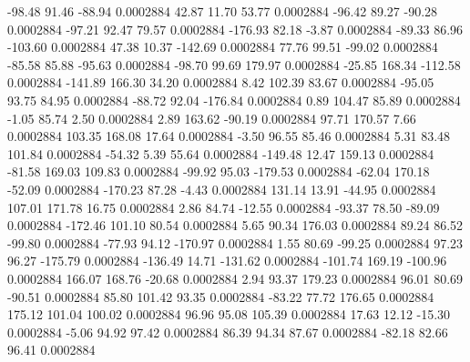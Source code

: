      -98.48       91.46      -88.94     0.0002884
       42.87       11.70       53.77     0.0002884
      -96.42       89.27      -90.28     0.0002884
      -97.21       92.47       79.57     0.0002884
     -176.93       82.18       -3.87     0.0002884
      -89.33       86.96     -103.60     0.0002884
       47.38       10.37     -142.69     0.0002884
       77.76       99.51      -99.02     0.0002884
      -85.58       85.88      -95.63     0.0002884
      -98.70       99.69      179.97     0.0002884
      -25.85      168.34     -112.58     0.0002884
     -141.89      166.30       34.20     0.0002884
        8.42      102.39       83.67     0.0002884
      -95.05       93.75       84.95     0.0002884
      -88.72       92.04     -176.84     0.0002884
        0.89      104.47       85.89     0.0002884
       -1.05       85.74        2.50     0.0002884
        2.89      163.62      -90.19     0.0002884
       97.71      170.57        7.66     0.0002884
      103.35      168.08       17.64     0.0002884
       -3.50       96.55       85.46     0.0002884
        5.31       83.48      101.84     0.0002884
      -54.32        5.39       55.64     0.0002884
     -149.48       12.47      159.13     0.0002884
      -81.58      169.03      109.83     0.0002884
      -99.92       95.03     -179.53     0.0002884
      -62.04      170.18      -52.09     0.0002884
     -170.23       87.28       -4.43     0.0002884
      131.14       13.91      -44.95     0.0002884
      107.01      171.78       16.75     0.0002884
        2.86       84.74      -12.55     0.0002884
      -93.37       78.50      -89.09     0.0002884
     -172.46      101.10       80.54     0.0002884
        5.65       90.34      176.03     0.0002884
       89.24       86.52      -99.80     0.0002884
      -77.93       94.12     -170.97     0.0002884
        1.55       80.69      -99.25     0.0002884
       97.23       96.27     -175.79     0.0002884
     -136.49       14.71     -131.62     0.0002884
     -101.74      169.19     -100.96     0.0002884
      166.07      168.76      -20.68     0.0002884
        2.94       93.37      179.23     0.0002884
       96.01       80.69      -90.51     0.0002884
       85.80      101.42       93.35     0.0002884
      -83.22       77.72      176.65     0.0002884
      175.12      101.04      100.02     0.0002884
       96.96       95.08      105.39     0.0002884
       17.63       12.12      -15.30     0.0002884
       -5.06       94.92       97.42     0.0002884
       86.39       94.34       87.67     0.0002884
      -82.18       82.66       96.41     0.0002884
